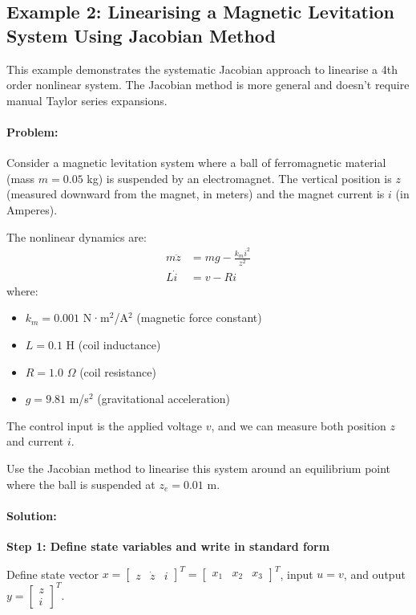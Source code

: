 \documentclass[11pt,a4paper]{article}
\begin{document}
\subsection{Example 2: Linearising a Magnetic Levitation System Using Jacobian Method}

This example demonstrates the systematic Jacobian approach to linearise a 4th order nonlinear system. The Jacobian method is more general and doesn't require manual Taylor series expansions.

\paragraph{Problem:}
Consider a magnetic levitation system where a ball of ferromagnetic material (mass $m = 0.05$ kg) is suspended by an electromagnet. The vertical position is $z$ (measured downward from the magnet, in meters) and the magnet current is $i$ (in Amperes).

The nonlinear dynamics are:
\begin{align}
  m\ddot{z} &= mg - \frac{k_m i^2}{z^2}\\
  L\dot{i} &= v - Ri
\end{align}
where:
\begin{itemize}
  \item $k_m = 0.001$ N·m$^2$/A$^2$ (magnetic force constant)
  \item $L = 0.1$ H (coil inductance)
  \item $R = 1.0$ $\Omega$ (coil resistance)
  \item $g = 9.81$ m/s$^2$ (gravitational acceleration)
\end{itemize}

The control input is the applied voltage $v$, and we can measure both position $z$ and current $i$.

Use the Jacobian method to linearise this system around an equilibrium point where the ball is suspended at $z_e = 0.01$ m.

\paragraph{Solution:}

\textbf{Step 1: Define state variables and write in standard form}

Define state vector $x = \begin{bmatrix} z & \dot{z} & i \end{bmatrix}^T = \begin{bmatrix} x_1 & x_2 & x_3 \end{bmatrix}^T$, input $u = v$, and output $y = \begin{bmatrix} z \\ i \end{bmatrix}^T$.
\end{document}

